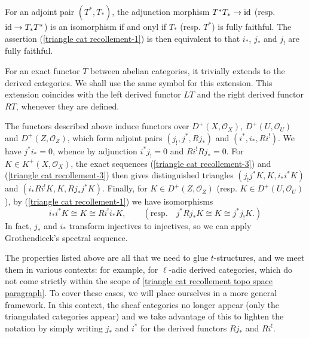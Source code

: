 For an adjoint pair $(T^*,T_*)$, the adjunction morphism $T^*T_*\to\operatorname{id}$ (resp. $\operatorname{id}\to T_*T^*$) is an isomorphism if and onyl if $T_*$ (resp. $T^*$) is fully faithful. The assertion (\ref{triangle cat recollement-1}) is then equivalent to that $i_*$, $j_*$ and $j_!$ are fully faithful.\par

For an exact functor $T$ between abelian categories, it trivially extends to the derived categories. We shall use the same symbol for this extension. This extension coincides with the left derived functor $LT$ and the right derived functor $RT$, whenever they are defined.\par
The functors described above induce functors over $D^+(X,\mathscr{O}_X)$, $D^+(U,\mathscr{O}_U)$ and $D^+(Z,\mathscr{O}_Z)$, which form adjoint pairs $(j_!,j^*,Rj_*)$ and $(i^*,i_*,Ri^!)$. We have $j^*i_*=0$, whence by adjunction $i^*j_!=0$ and $Ri^!Rj_*=0$. For $K\in K^+(X,\mathscr{O}_X)$, the exact sequences (\ref{triangle cat recollement-3}) and (\ref{triangle cat recollement-3}) then gives distinguished triangles $(j_!j^*K,K,i_*i^*K)$ and $(i_*Ri^!K,K,Rj_*j^*K)$. Finally, for $K\in D^+(Z,\mathscr{O}_Z)$ (resp. $K\in D^+(U,\mathscr{O}_U)$), by (\ref{triangle cat recollement-1}) we have isomorphisms
\[i_*i^*K\cong K\cong Ri^!i_*K,\quad\quad(\text{resp.}\quad j^*Rj_*K\cong K\cong j^*j_!K.)\]
In fact, $j_*$ and $i_*$ transform injectives to injectives, so we can apply Grothendieck's spectral sequence.\par

The properties listed above are all that we need to glue $t$-structures, and we meet them in various contexts: for example, for $\ell$-adic derived categories, which do not come strictly within the scope of \ref{triangle cat recollement topo space paragraph}. To cover these cases, we will place ourselves in a more general framework. In this context, the sheaf categories no longer appear (only the triangulated categories appear) and we take advantage of this to lighten the notation by simply writing $j_*$ and $i^*$ for the derived functors $Rj_*$ and $Ri^!$.

